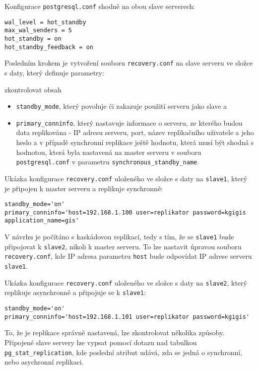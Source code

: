 Konfigurace \texttt{postgresql.conf} shodně na obou slave serverech:
\begin{lstlisting}
wal_level = hot_standby
max_wal_senders = 5
hot_standby = on
hot_standby_feedback = on
\end{lstlisting}

Posledním krokem je vytvoření souboru \texttt{recovery.conf} na slave serveru ve
složce s daty, který definuje parametry:
\begin{framed}
  zkontrolovat obsah
\end{framed}
\begin{itemize}
  \item \texttt{standby\_mode}, který povoluje či zakazuje použití serveru jako
    slave a
  \item \texttt{primary\_conninfo}, který nastavuje informace o serveru, ze
    kterého budou data replikována - IP adresu serveru, port, název replikačního
    uživatele a jeho heslo a v případě synchronní replikace ještě hodnotu,
    která musí být shodná s hodnotou, která byla nastavená na master serveru v
    souboru \texttt{postgresql.conf} v parametru
    \texttt{synchronous\_standby\_name}.
\end{itemize}

Ukázka konfigurace \texttt{recovery.conf} uloženého ve složce s daty na
\texttt{slave1}, který je připojen k master serveru a replikuje synchronně:

\begin{lstlisting}
standby_mode='on'
primary_conninfo='host=192.168.1.100 user=replikator password=kgigis application_name=gis'
\end{lstlisting}

V návrhu je počítáno s kaskádovou replikací, tedy s tím, že se \texttt{slave1}
bude připojovat k \texttt{slave2}, nikoli k master serveru. To lze nastavit
úpravou souboru \texttt{recovery.conf}, kde IP adresa parametru \texttt{host}
bude odpovídat IP adrese serveru \texttt{slave1}.

Ukázka konfigurace \texttt{recovery.conf} uloženého ve složce s daty na
\texttt{slave2}, který replikuje asynchronně a připojuje se k
\texttt{slave1}:

\begin{lstlisting}
standby_mode='on'
primary_conninfo='host=192.168.1.101 user=replikator password=kgigis'
\end{lstlisting}

To, že je replikace správně nastavená, lze zkontrolovat několika způsoby.
Připojené slave servery lze vypsat pomocí dotazu nad tabulkou
\texttt{pg\_stat\_replication}, kde poslední atribut udává, zda se jedná o
synchronní, nebo asychronní replikaci.

